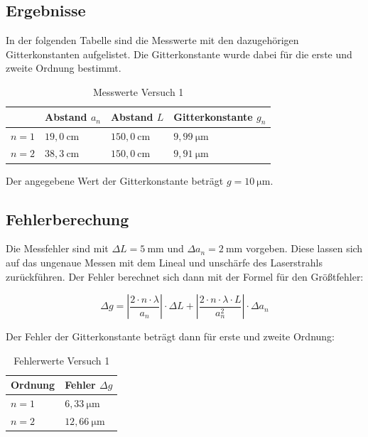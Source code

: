     \subsection{Ergebnisse}

        In der folgenden Tabelle sind die Messwerte mit den dazugehörigen Gitterkonstanten aufgelistet. Die Gitterkonstante wurde dabei für die erste und zweite Ordnung bestimmt.

        \begin{table}[H]
            \centering
            \caption{Messwerte Versuch 1}
            \vspace*{1em}
            \begin{tabular}{|l|l|l|l|}
                \hline
                & Abstand $a_{n}$ & Abstand $L$ & Gitterkonstante $g_{n}$\\
                \hline
                $n = 1$ & $19,0\ \mathrm{cm}$ & $150,0\ \mathrm{cm}$ & $9,99\ \mathrm{\mu m}$\\
                \hline
                $n = 2$ & $38,3\ \mathrm{cm}$ & $150,0\ \mathrm{cm}$ & $9,91\ \mathrm{\mu m}$\\
                \hline
            \end{tabular}
        \end{table}

        Der angegebene Wert der Gitterkonstante beträgt $g = 10\ \mathrm{\mu m}$.
    
    \subsection{Fehlerberechung}
        
        Die Messfehler sind mit $\Delta L = 5\ \mathrm{mm}$ und $\Delta a_{n} = 2\ \mathrm{mm}$ vorgeben. Diese lassen sich auf das ungenaue Messen mit dem Lineal und unschärfe des Laserstrahls zurückführen. Der Fehler berechnet sich dann mit der Formel für den Größtfehler:

        \begin{equation}
            \Delta g = \left|\frac{2 \cdot n \cdot \lambda}{a_{n}}\right| \cdot \Delta L + \left|\frac{2 \cdot n \cdot \lambda \cdot L}{a_{n}^{2}}\right| \cdot \Delta a_{n}
        \end{equation}

        Der Fehler der Gitterkonstante beträgt dann für erste und zweite Ordnung:

        \begin{table}[H]
            \centering
            \caption{Fehlerwerte Versuch 1}
            \vspace*{1em}
            \begin{tabular}{|l|l|}
                \hline
                Ordnung & Fehler $\Delta g$\\
                \hline
                $n = 1$ & $6,33\ \mathrm{\mu m}$\\
                \hline
                $n = 2$ & $12,66\ \mathrm{\mu m}$\\
                \hline
            \end{tabular}
        \end{table}
        
